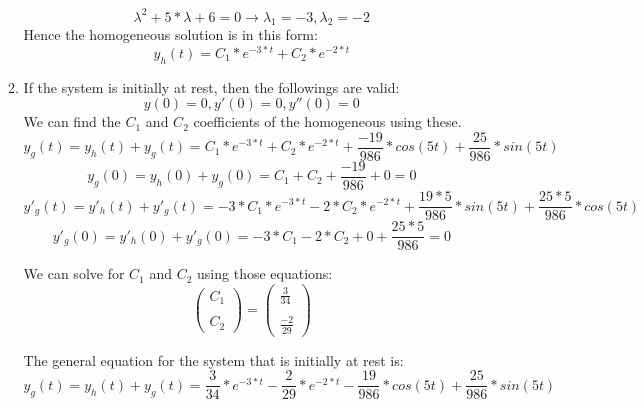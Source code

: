 \documentclass[10pt,a4paper, margin=1in]{article}
\begin{document}
\begin{enumerate}
\begin{enumerate}
\begin{equation*}
    \lambda ^2 + 5*\lambda + 6 = 0 \rightarrow \lambda_1 = -3, \lambda_2 = -2
\end{equation*}
Hence the homogeneous solution is in this form:
\begin{equation}
    y_h(t) = C_1*e^{-3*t} + C_2*e^{-2*t}
\end{equation}

	\item %

 If the system is initially at rest, then the followings are valid:
 \begin{equation*}
     y(0) = 0, y'(0) = 0, y''(0)=0 
 \end{equation*}
We can find the $C_1$ and $C_2$ coefficients of the homogeneous using these.
\begin{equation*}
    y_g(t) =y_h(t) + y_g(t) = C_1*e^{-3*t} + C_2*e^{-2*t} + \frac{-19}{986}*cos(5t)  + \frac{25}{986}*sin(5t) 
\end{equation*}
\begin{equation*}
    y_g(0) =y_h(0) + y_g(0) = C_1 + C_2 + \frac{-19}{986}+ 0 = 0
\end{equation*}
\begin{equation*}
    y'_g(t) =y'_h(t) + y'_g(t) = -3*C_1*e^{-3*t} -2* C_2*e^{-2*t} +\frac{19*5}{986}*sin(5t) + \frac{25*5}{986}*cos(5t)
\end{equation*}
\begin{equation*}
    y'_g(0) =y'_h(0) + y'_g(0) = -3*C_1 -2* C_2 + 0 + \frac{25*5}{986}  = 0
\end{equation*}

We can solve for $C_1$ and $C_2$ using those equations:
\begin{equation*}
    \begin{pmatrix} C_1 \\\\ C_2 \end{pmatrix} = \begin{pmatrix} \frac{3}{34} \\\\ \frac{-2}{29} \end{pmatrix} 
\end{equation*}

The general equation for the system that is initially at rest is:
\begin{equation}
    y_g(t) =y_h(t) + y_g(t) = \frac{3}{34}*e^{-3*t} - \frac{2}{29}*e^{-2*t} - \frac{19}{986}*cos(5t)  + \frac{25}{986}*sin(5t) 
\end{equation}


\end{enumerate}
\end{enumerate}
\end{document}
